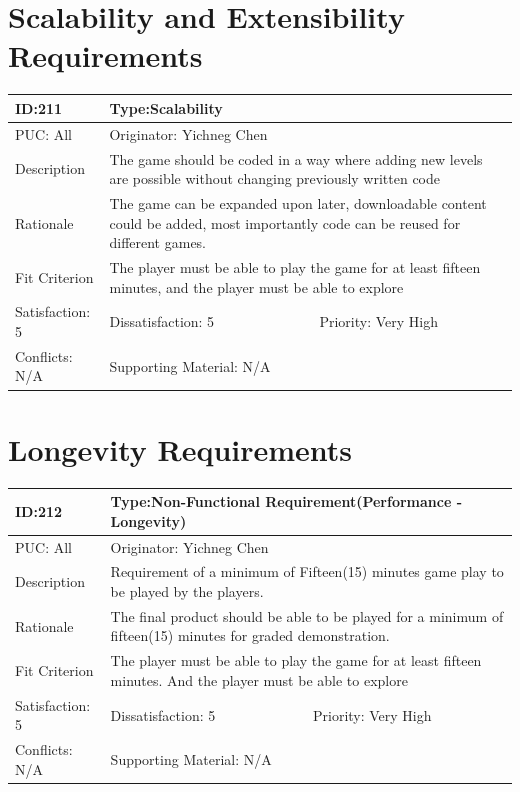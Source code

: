 \documentclass{article}
\begin{document}
	\section{Scalability and Extensibility Requirements}
	\begin{table}[H]
		\begin{tabular}{|l|l|l|}
			\hline
			ID:211 & \multicolumn{2}{l|}{Type:Scalability} \\ \hline
			PUC: All & \multicolumn{2}{l|}{Originator: Yichneg Chen} \\ \hline
			Description & \multicolumn{2}{m{0.85\textwidth}|}{The game should be coded in a way where adding new levels are possible without changing previously written code} \\ \hline
			Rationale & \multicolumn{2}{m{0.85\textwidth}|}{The game can be expanded upon later, downloadable content could be added, most importantly code can be reused for different games.} \\ \hline
			Fit Criterion & \multicolumn{2}{m{0.85\textwidth}|}{The player must be able to play the game for at least fifteen minutes, and the player must be able to explore} \\ \hline
			Satisfaction: 5 & Dissatisfaction: 5 & Priority: Very High \\ \hline
			Conflicts: N/A & \multicolumn{2}{l|}{Supporting Material: N/A} \\ \hline
		\end{tabular}
	\end{table}

	\section{Longevity Requirements}
	\begin{table}[H]
		\begin{tabular}{|l|l|l|}
			\hline
			ID:212 & \multicolumn{2}{l|}{Type:Non-Functional Requirement(Performance - Longevity)} \\ \hline
			PUC: All & \multicolumn{2}{l|}{Originator: Yichneg Chen} \\ \hline
			Description & \multicolumn{2}{m{0.85\textwidth}|}{Requirement of a minimum of Fifteen(15) minutes game play to be played by the players.} \\ \hline
			Rationale & \multicolumn{2}{m{0.85\textwidth}|}{The final product should be able to be played for a minimum of fifteen(15) minutes for graded demonstration.} \\ \hline
			Fit Criterion & \multicolumn{2}{m{0.85\textwidth}|}{The player must be able to play the game for at least fifteen minutes. And the player must be able to explore} \\ \hline
			Satisfaction: 5 & Dissatisfaction: 5 & Priority: Very High \\ \hline
			Conflicts: N/A & \multicolumn{2}{l|}{Supporting Material: N/A} \\ \hline
		\end{tabular}
	\end{table}
\end{document}
